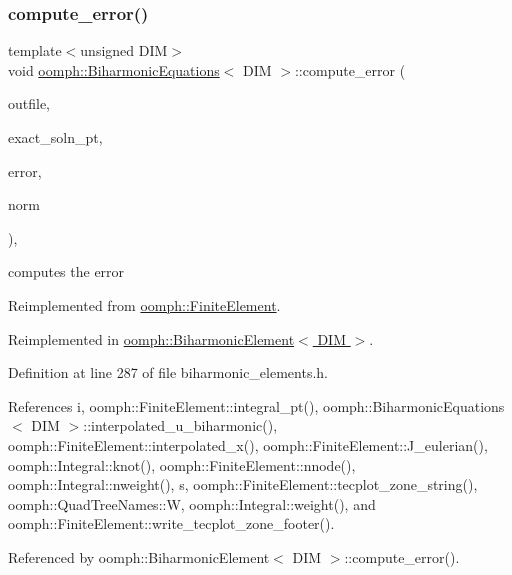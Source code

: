 \subsubsection{\texorpdfstring{compute\+\_\+error()}{compute\_error()}\hspace{0.1cm}{\footnotesize\ttfamily [1/2]}}
{\footnotesize\ttfamily template$<$unsigned D\+IM$>$ \\
void \hyperlink{classoomph_1_1BiharmonicEquations}{oomph\+::\+Biharmonic\+Equations}$<$ D\+IM $>$\+::compute\+\_\+error (\begin{DoxyParamCaption}\item[{std\+::ostream \&}]{outfile,  }\item[{\hyperlink{classoomph_1_1FiniteElement_a690fd33af26cc3e84f39bba6d5a85202}{Finite\+Element\+::\+Steady\+Exact\+Solution\+Fct\+Pt}}]{exact\+\_\+soln\+\_\+pt,  }\item[{double \&}]{error,  }\item[{double \&}]{norm }\end{DoxyParamCaption})\hspace{0.3cm}{\ttfamily [inline]}, {\ttfamily [virtual]}}



computes the error 



Reimplemented from \hyperlink{classoomph_1_1FiniteElement_a73c79a1f1e5b1d334757812a6bbd58ff}{oomph\+::\+Finite\+Element}.



Reimplemented in \hyperlink{classoomph_1_1BiharmonicElement_a456d89dce0ecf60aafab33c035838581}{oomph\+::\+Biharmonic\+Element$<$ D\+I\+M $>$}.



Definition at line 287 of file biharmonic\+\_\+elements.\+h.



References i, oomph\+::\+Finite\+Element\+::integral\+\_\+pt(), oomph\+::\+Biharmonic\+Equations$<$ D\+I\+M $>$\+::interpolated\+\_\+u\+\_\+biharmonic(), oomph\+::\+Finite\+Element\+::interpolated\+\_\+x(), oomph\+::\+Finite\+Element\+::\+J\+\_\+eulerian(), oomph\+::\+Integral\+::knot(), oomph\+::\+Finite\+Element\+::nnode(), oomph\+::\+Integral\+::nweight(), s, oomph\+::\+Finite\+Element\+::tecplot\+\_\+zone\+\_\+string(), oomph\+::\+Quad\+Tree\+Names\+::W, oomph\+::\+Integral\+::weight(), and oomph\+::\+Finite\+Element\+::write\+\_\+tecplot\+\_\+zone\+\_\+footer().



Referenced by oomph\+::\+Biharmonic\+Element$<$ D\+I\+M $>$\+::compute\+\_\+error().

